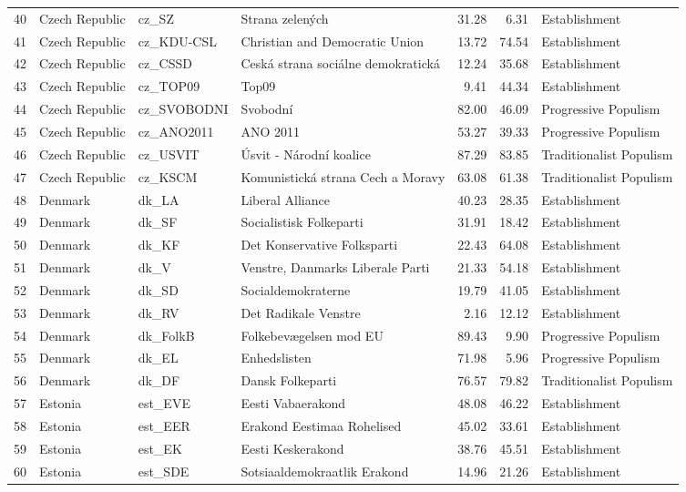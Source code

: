 \begin{longtable}[c]{@{\extracolsep{\fill}}rlllrrl}
		40 & Czech Republic & cz\_SZ & Strana zelených & 31.28 & 6.31 & Establishment \\
		41 & Czech Republic & cz\_KDU-CSL & Christian and Democratic Union & 13.72 & 74.54 & Establishment \\
		42 & Czech Republic & cz\_CSSD & Ceská strana sociálne demokratická & 12.24 & 35.68 & Establishment \\
		43 & Czech Republic & cz\_TOP09 & Top09 & 9.41 & 44.34 & Establishment \\
		44 & Czech Republic & cz\_SVOBODNI & Svobodní & 82.00 & 46.09 & Progressive Populism \\
		45 & Czech Republic & cz\_ANO2011 & ANO 2011 & 53.27 & 39.33 & Progressive Populism \\
		46 & Czech Republic & cz\_USVIT & Úsvit - Národní koalice & 87.29 & 83.85 & Traditionalist Populism \\
		47 & Czech Republic & cz\_KSCM & Komunistická strana Cech a Moravy & 63.08 & 61.38 & Traditionalist Populism \\
		48 & Denmark & dk\_LA & Liberal Alliance & 40.23 & 28.35 & Establishment \\
		49 & Denmark & dk\_SF & Socialistisk Folkeparti & 31.91 & 18.42 & Establishment \\
		50 & Denmark & dk\_KF & Det Konservative Folksparti & 22.43 & 64.08 & Establishment \\
		51 & Denmark & dk\_V & Venstre, Danmarks Liberale Parti & 21.33 & 54.18 & Establishment \\
		52 & Denmark & dk\_SD & Socialdemokraterne & 19.79 & 41.05 & Establishment \\
		53 & Denmark & dk\_RV & Det Radikale Venstre & 2.16 & 12.12 & Establishment \\
		54 & Denmark & dk\_FolkB & Folkebevægelsen mod EU & 89.43 & 9.90 & Progressive Populism \\
		55 & Denmark & dk\_EL & Enhedslisten & 71.98 & 5.96 & Progressive Populism \\
		56 & Denmark & dk\_DF & Dansk Folkeparti & 76.57 & 79.82 & Traditionalist Populism \\
		57 & Estonia & est\_EVE & Eesti Vabaerakond & 48.08 & 46.22 & Establishment \\
		58 & Estonia & est\_EER & Erakond Eestimaa Rohelised & 45.02 & 33.61 & Establishment \\
		59 & Estonia & est\_EK & Eesti Keskerakond & 38.76 & 45.51 & Establishment \\
		60 & Estonia & est\_SDE & Sotsiaaldemokraatlik Erakond & 14.96 & 21.26 & Establishment \\

\end{longtable}
